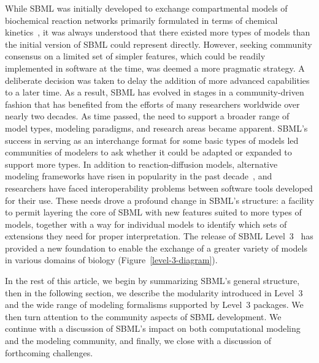 \documentclass{sbml-paper}
\begin{document}
While SBML was initially developed to exchange compartmental models of biochemical reaction networks primarily formulated in terms of chemical kinetics~\citep{hucka_2002}, it was always understood that there existed more types of models than the initial version of SBML could represent directly. However, seeking community consensus on a limited set of simpler features, which could be readily implemented in software at the time, was deemed a more pragmatic strategy. A deliberate decision was taken to delay the addition of more advanced capabilities to a later time.  As a result, SBML has evolved in stages in a community-driven fashion that has benefited from the efforts of many researchers worldwide over nearly two decades.  As time passed, the need to support a broader range of model types, modeling paradigms, and research areas became apparent.  SBML's success in serving as an interchange format for some basic types of models led communities of modelers to ask whether it could be adapted or expanded to support more types.  In addition to reaction-diffusion models, alternative modeling frameworks have risen in popularity in the past decade~\citep{Machado2011modelinga}, and researchers have faced interoperability problems between software tools developed for their use.  These needs drove a profound change in SBML's structure: a facility to permit layering the core of SBML with new features suited to more types of models, together with a way for individual models to identify which sets of extensions they need for proper interpretation.  The release of SBML Level~3~\citep{Hucka2010a} has provided a new foundation to enable the exchange of a greater variety of models in various domains of biology (Figure~\ref{level-3-diagram}).

In the rest of this article, we begin by summarizing SBML's general structure, then in the following section, we describe the modularity introduced in Level~3 and the wide range of modeling formalisms supported by Level~3 packages.  We then turn attention to the community aspects of SBML development.  We continue with a discussion of SBML's impact on both computational modeling and the modeling community, and finally, we close with a discussion of forthcoming challenges.
\end{document}
